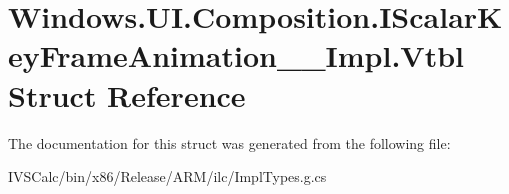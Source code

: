 \hypertarget{struct_windows_1_1_u_i_1_1_composition_1_1_i_scalar_key_frame_animation_____impl_1_1_vtbl}{}\section{Windows.\+U\+I.\+Composition.\+I\+Scalar\+Key\+Frame\+Animation\+\_\+\+\_\+\+Impl.\+Vtbl Struct Reference}
\label{struct_windows_1_1_u_i_1_1_composition_1_1_i_scalar_key_frame_animation_____impl_1_1_vtbl}


The documentation for this struct was generated from the following file\+:\begin{DoxyCompactItemize}
\item 
I\+V\+S\+Calc/bin/x86/\+Release/\+A\+R\+M/ilc/Impl\+Types.\+g.\+cs\end{DoxyCompactItemize}
